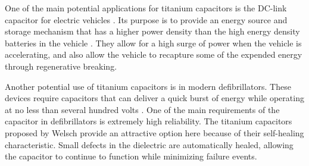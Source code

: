 One of the main potential applications for titanium capacitors is the DC-link capacitor for electric vehicles \cite{dclink}. Its purpose is to provide an energy source and storage mechanism that has a higher power density than the high energy density batteries in the vehicle \cite{thounthong2006control}. They allow for a high surge of power when the vehicle is accelerating, and also allow the vehicle to recapture some of the expended energy through regenerative breaking.

Another potential use of titanium capacitors is in modern defibrillators. These devices require capacitors that can deliver a quick burst of energy while operating at no less than several hundred volts \cite{shephard1961design}\cite{idiot_defibrillator}. One of the main requirements of the capacitor in defibrillators is extremely high reliability. The titanium capacitors proposed by Welsch \cite{welsch22nd} provide an attractive option here because of their self-healing characteristic. Small defects in the dielectric are automatically healed, allowing the capacitor to continue to function while minimizing failure events. 

